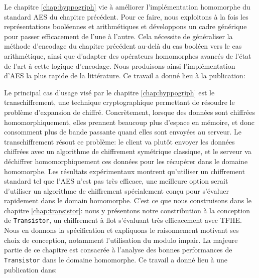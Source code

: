 \begin{center}
\end{center}

Le chapitre \ref{chap:hyppogriph} vie à améliorer l'implémentation homomorphe du standard AES du chapitre précédent. Pour ce faire, nous exploitons à la fois les représentations booléennes et arithmétiques et développons un cadre générique pour passer efficacement de l’une à l’autre. Cela nécessite de généraliser la méthode d’encodage du chapitre précédent au-delà du cas booléen vers le cas arithmétique, ainsi que d'adapter des opérateurs homomorphes avancés de l'état de l'art à cette logique d'encodage. Nous produisons ainsi l'implémentation d’AES la plus rapide de la littérature.
Ce travail a donné lieu à la publication:

\begin{center}
\end{center}

Le principal cas d'usage visé par le chapitre \ref{chap:hyppogriph} est le transchiffrement, une technique cryptographique permettant de résoudre le problème d'expansion de chiffré. Concrètement, lorsque des données sont chiffrées homomorphiquement, elles prennent beaucoup plus d'espace en mémoire, et donc consomment plus de bande passante quand elles sont envoyées au serveur. Le transchiffrement résout ce problème: le client va plutôt envoyer les données chiffrées avec un algorithme de chiffrement symétrique classique, et le serveur va déchiffrer homomorphiquement ces données pour les récupérer dans le domaine homomorphe. Les résultats expérimentaux montrent qu'utiliser un chiffrement standard tel que l'AES n'est pas très efficace, une meilleure option serait d'utiliser un algorithme de chiffrement spécialement conçu pour s'évaluer rapidement dans le domain homomorphe. C'est ce que nous construisons dans le chapitre \ref{chap:transistor}: nous y présentons notre constribution à la conception de \texttt{Transistor}, un chiffrement à flot s'évaluant très efficacement avec TFHE.  Nous en donnons la spécification et expliquons le raisonnement motivant ses choix de conception, notamment l'utilisation du modulo impair. La majeure partie de ce chapitre est consacrée à l’analyse des bonnes performances de \texttt{Transistor} dans le domaine homomorphe.
Ce travail a donné lieu à une publication dans:

\begin{center}
\end{center}

